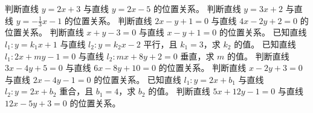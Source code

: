 \begin{Exercise}[title={两条直线的位置关系小练习}, label={ex:line_position},difficulty=1]
    \Question 判断直线 $y = 2x + 3$ 与直线 $y = 2x - 5$ 的位置关系。
    \Question 判断直线 $y = 3x + 2$ 与直线 $y=-\frac{1}{3}x - 1$ 的位置关系。
    \Question 判断直线 $2x - y + 1 = 0$ 与直线 $4x - 2y + 2 = 0$ 的位置关系。
    \Question 判断直线 $x + y - 3 = 0$ 与直线 $x - y + 1 = 0$ 的位置关系。
    \Question 已知直线 $l_1:y = k_1x + 1$ 与直线 $l_2:y = k_2x - 2$ 平行，且 $k_1 = 3$，求 $k_2$ 的值。
    \Question 已知直线 $l_1:2x + my - 1 = 0$ 与直线 $l_2:mx + 8y + 2 = 0$ 垂直，求 $m$ 的值。
    \Question 判断直线 $3x - 4y + 5 = 0$ 与直线 $6x - 8y + 10 = 0$ 的位置关系。
    \Question 判断直线 $x - 2y + 3 = 0$ 与直线 $2x - 4y - 1 = 0$ 的位置关系。
    \Question 已知直线 $l_1:y = 2x + b_1$ 与直线 $l_2:y = 2x + b_2$ 重合，且 $b_1 = 4$，求 $b_2$ 的值。
    \Question 判断直线 $5x + 12y - 1 = 0$ 与直线 $12x - 5y + 3 = 0$ 的位置关系。
\end{Exercise}
